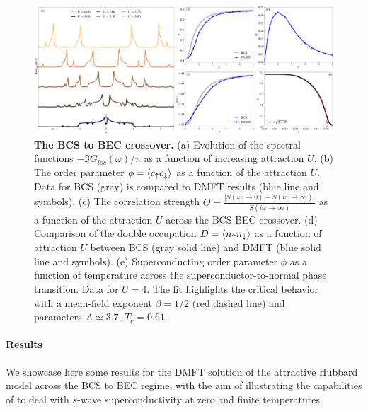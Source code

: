 \begin{figure}[t!]
  \includegraphics[width=\linewidth]{figures/figAHM.pdf}
    \caption{\label{figEx2}%
      \textbf{The BCS to BEC crossover.}
      (a) Evolution of the spectral functions
      $-\Im{G_{loc}(\omega)}/\pi$ as a function of increasing
      attraction $U$. 
      (b) The order parameter $\phi=\langle c_\uparrow c_\downarrow\rangle$ as a
      function of the attraction $U$. Data for BCS (gray) is compared
      to DMFT results (blue line and symbols). 
      (c) The correlation strength
      $\Theta=\frac{|S(i\omega\to0)-S(i\omega\to\infty)|}{S(i\omega\to\infty)}$ as a function of the
      attraction $U$ across the BCS-BEC crossover. 
      (d) Comparison of the double occupation $D=\langle n_\uparrow
      n_\downarrow\rangle$ as a function of attraction $U$ between BCS (gray
      solid line) and DMFT (blue solid line and symbols). 
      (e) Superconducting order
      parameter $\phi$ as a function of temperature across the
      superconductor-to-normal phase transition. Data for $U=4$. The
      fit highlights the critical behavior with a mean-field exponent
      $\beta=1/2$ (red dashed line) and parameters $A\simeq 3.7$, $T_c=0.61$.       
        }
\end{figure}

\paragraph{Results}
We showcase here some results for the DMFT solution of the attractive
Hubbard model across the BCS to BEC regime, with the aim of
illustrating the capabilities of \NAME to deal with $s$-wave
superconductivity at zero and finite temperatures.

